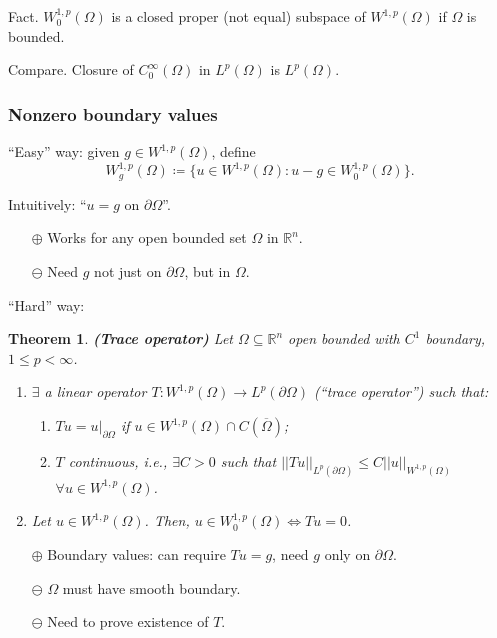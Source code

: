 \documentclass[12pt]{article}
\newtheorem{theorem}{Theorem}[section]
\theoremstyle{definition}
\begin{document}
Fact. $W_0^{1,p}(\Omega)$ is a closed proper (not equal) subspace of $W^{1,p}(\Omega)$ if $\Omega$ is bounded.

Compare. Closure of $C_0^\infty(\Omega)$ in $L^p(\Omega)$ is $L^p(\Omega)$.

\subsubsection{Nonzero boundary values}
``Easy'' way: given $g\in W^{1,p}(\Omega)$, define
\[W_g^{1,p}(\Omega)\coloneqq\{u\in W^{1,p}(\Omega):u-g\in W_0^{1,p}(\Omega)\}.\]

Intuitively: ``$u=g$ on $\partial\Omega$''.

\begin{itemize}
\item[$\boldsymbol\oplus$] Works for any open bounded set $\Omega$ in $\mathbb R^n$.

\item[$\boldsymbol\ominus$] Need $g$ not just on $\partial\Omega$, but in $\Omega$.
\end{itemize}

``Hard'' way:
\begin{theorem}\label{trace_operator}
\emph{\textbf{(Trace operator)}} Let $\Omega\subseteq\mathbb R^n$ open bounded with $C^1$ boundary, $1\leq p<\infty$.

\begin{enumerate}[label=\alph*)]
\item $\exists$ a linear operator $T:W^{1,p}(\Omega)\rightarrow L^p(\partial\Omega)$ (``trace operator'') such that:
\begin{enumerate}[label=\roman*)]
\item $Tu=u|_{\partial\Omega}$ if $u\in W^{1,p}(\Omega)\cap C(\overline\Omega)$;
\item $T$ continuous, i.e., $\exists C>0$ such that $||Tu||_{L^p(\partial\Omega)}\leq C||u||_{W^{1,p}(\Omega)}$ $\forall u\in W^{1,p}(\Omega)$.
\end{enumerate}

\item Let $u\in W^{1,p}(\Omega)$. Then, $u\in W_0^{1,p}(\Omega)\Longleftrightarrow Tu=0$.
\end{enumerate}
\end{theorem}

\begin{itemize}
\item[$\boldsymbol\oplus$] Boundary values: can require $Tu=g$, need $g$ only on $\partial\Omega$.

\item[$\boldsymbol\ominus$] $\Omega$ must have smooth boundary.

\item[$\boldsymbol\ominus$] Need to prove existence of $T$.
\end{itemize}
\end{document}
